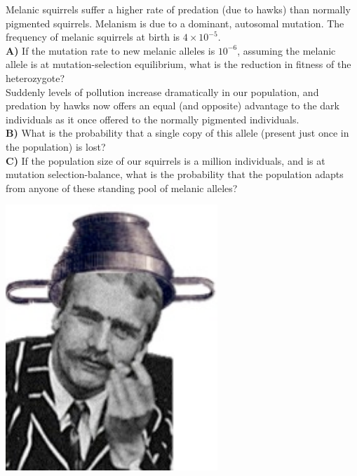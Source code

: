 \begin{question}
Melanic squirrels suffer a higher rate of predation (due to hawks) than normally pigmented squirrels. Melanism is due to a dominant, autosomal mutation. The frequency of melanic squirrels at birth is $4 \times 10^{-5}$.\\

{\bf A)} If the mutation rate to new melanic alleles is $10^{-6}$,
assuming the melanic allele is at mutation-selection equilibrium, what
is the reduction in fitness of the heterozygote? \\ 
Suddenly levels of pollution increase dramatically in our population,
and predation by hawks now offers an equal (and opposite) advantage to
the dark individuals as it once offered to the normally pigmented
individuals. \\
{\bf B)} What is the probability that a single copy of this allele
(present just once in the population) is lost?\\ 
{\bf C)}  If the population size of our squirrels is a million
individuals, and is at mutation selection-balance, what is the probability that the population adapts from
anyone of these standing pool of melanic alleles?  
\end{question}

\begin{marginfigure}
  \begin{center}
    \includegraphics[width=0.6\textwidth]{figures/haldanes_sieve.png}
\end{center}
\caption{} \label{fig:haldanes_sieve}
\end{marginfigure}

